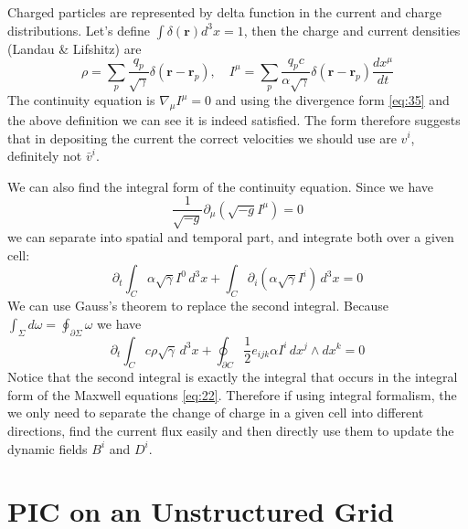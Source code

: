 Charged particles are represented by delta function in the current and charge
distributions. Let's define $\int \delta(\mathbf{r})d^3x = 1$, then the charge
and current densities (Landau \& Lifshitz) are
\begin{equation}
  \label{eq:34}
  \rho = \sum_p\frac{q_p}{\sqrt{\gamma}}\delta(\mathbf{r}-\mathbf{r}_p),\quad I^{\mu} = \sum_p\frac{q_pc}{\alpha\sqrt{\gamma}}\delta(\mathbf{r} - \mathbf{r}_p)\frac{dx^{\mu}}{dt}
\end{equation}
The continuity equation is $\nabla_{\mu}I^{\mu} = 0$ and using the divergence
form \eqref{eq:35} and the above definition we can see it is indeed satisfied.
The form therefore suggests that in depositing the current the correct
velocities we should use are $v^i$, definitely not $\bar{v}^i$.

We can also find the integral form of the continuity equation. Since we have
\begin{equation}
  \label{eq:35}
  \frac{1}{\sqrt{-g}}\partial_{\mu}\left( \sqrt{-g} I^{\mu} \right) = 0
\end{equation}
we can separate into spatial and temporal part, and integrate both over a given
cell:
\begin{equation}
  \label{eq:36}
  \partial_t\int_C \alpha\sqrt{\gamma}I^0\,d^3x + \int_C \partial_i \left( \alpha\sqrt{\gamma}I^i \right)\,d^3x = 0
\end{equation}
We can use Gauss's theorem to replace the second integral. Because $\int_{\Sigma} d\omega
= \oint_{\partial\Sigma}\omega$ we have
\begin{equation}
  \label{eq:37}
  \partial_t\int_Cc\rho\sqrt{\gamma}\,d^3x + \oint_{\partial C}\frac{1}{2}e_{ijk}\alpha I^i\,dx^j\wedge dx^k = 0
\end{equation}
Notice that the second integral is exactly the integral that occurs in the
integral form of the Maxwell equations \eqref{eq:22}. Therefore if using
integral formalism, the we only need to separate the change of charge in a given
cell into different directions, find the current flux easily and then directly
use them to update the dynamic fields $B^i$ and $D^i$.

\section{PIC on an Unstructured Grid}
\label{sec:unstructured-pic}



